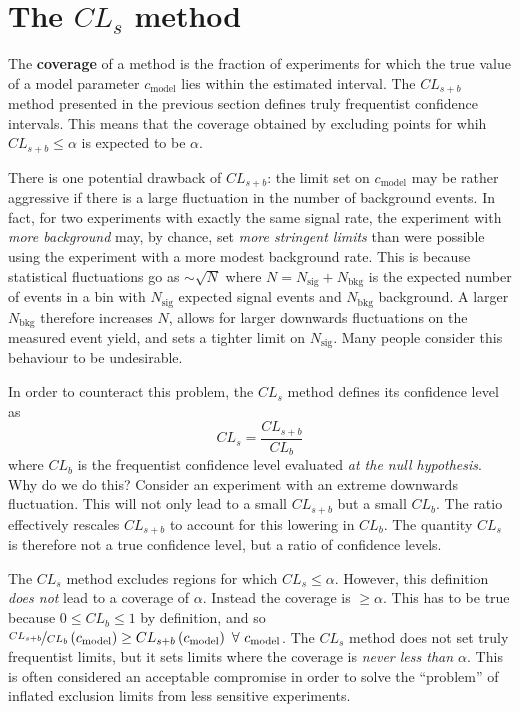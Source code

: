 \section{The $CL_s$ method}
\label{S. CLs}

The \textbf{coverage} of a method is the fraction of experiments for which the true value of a model parameter $c_\text{model}$ lies within the estimated interval. The $CL_{s+b}$ method presented in the previous section defines truly frequentist confidence intervals. This means that the coverage obtained by excluding points for whih $CL_{s+b}\leq\alpha$ is expected to be $\alpha$.

There is one potential drawback of $CL_{s+b}$: the limit set on $c_\text{model}$ may be rather aggressive if there is a large fluctuation in the number of background events. In fact, for two experiments with exactly the same signal rate, the experiment with \textit{more background} may, by chance, set \textit{more stringent limits} than were possible using the experiment with a more modest background rate. This is because statistical fluctuations go as $\sim\sqrt{N}$ where $N=N_\text{sig}+N_\text{bkg}$ is the expected number of events in a bin with $N_\text{sig}$ expected signal events and $N_\text{bkg}$ background. A larger $N_\text{bkg}$ therefore increases $N$, allows for larger downwards fluctuations on the measured event yield, and sets a tighter limit on $N_\text{sig}$. Many people consider this behaviour to be undesirable.

In order to counteract this problem, the $CL_s$ method defines its confidence level as
\begin{equation}
CL_s = \frac{CL_{s+b}}{CL_b}
\end{equation}
where $CL_b$ is the frequentist confidence level evaluated \textit{at the null hypothesis}. Why do we do this? Consider an experiment with an extreme downwards fluctuation. This will not only lead to a small $CL_{s+b}$ but a small $CL_b$. The ratio effectively rescales $CL_{s+b}$ to account for this lowering in $CL_b$. The quantity $CL_s$ is therefore not a true confidence level, but a ratio of confidence levels.

The $CL_s$ method excludes regions for which $CL_s\leq\alpha$. However, this definition \textit{does not} lead to a coverage of $\alpha$. Instead the coverage is $\geq\alpha$. This has to be true because $0\leq CL_b\leq 1$ by definition, and so $\nicefrac{CL_{s+b}}{CL_b}\left(c_\text{model}\right) \geq CL_{s+b}\left(c_\text{model}\right) ~\forall~ c_\text{model}$. The $CL_s$ method does not set truly frequentist limits, but it sets  limits where the coverage is \textit{never less than $\alpha$}. This is often considered an acceptable compromise in order to solve the ``problem'' of inflated exclusion limits from less sensitive experiments.
